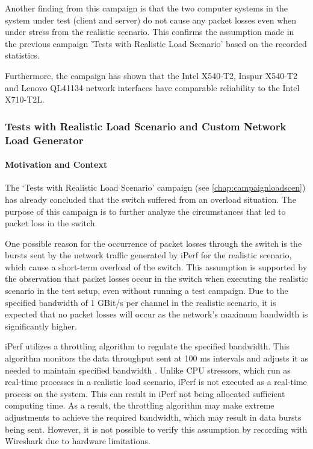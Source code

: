 Another finding from this campaign is that the two computer systems in the system under test (client and server) do not cause any packet losses even when under stress from the realistic scenario. This confirms the assumption made in the previous campaign 'Tests with Realistic Load Scenario' based on the recorded statistics.

Furthermore, the campaign has shown that the Intel X540-T2, Inspur X540-T2 and Lenovo QL41134 network interfaces have comparable reliability to the Intel X710-T2L.

\subsubsection{Tests with Realistic Load Scenario and Custom Network Load Generator}
\paragraph{Motivation and Context}
The `Tests with Realistic Load Scenario' campaign (see \ref{chap:campaignloadscen}) has already concluded that the switch suffered from an overload situation. The purpose of this campaign is to further analyze the circumstances that led to packet loss in the switch.

One possible reason for the occurrence of packet losses through the switch is the bursts sent by the network traffic generated by iPerf for the realistic scenario, which cause a short-term overload of the switch. This assumption is supported by the observation that packet losses occur in the switch when executing the realistic scenario in the test setup, even without running a test campaign. Due to the specified bandwidth of 1 GBit/s per channel in the realistic scenario, it is expected that no packet losses will occur as the network's maximum bandwidth is significantly higher.

iPerf utilizes a throttling algorithm to regulate the specified bandwidth. This algorithm monitors the data throughput sent at 100 ms intervals and adjusts it as needed to maintain specified bandwidth \cite{reli03}. Unlike CPU stressors, which run as real-time processes in a realistic load scenario, iPerf is not executed as a real-time process on the system. This can result in iPerf not being allocated sufficient computing time. As a result, the throttling algorithm may make extreme adjustments to achieve the required bandwidth, which may result in data bursts being sent. However, it is not possible to verify this assumption by recording with Wireshark due to hardware limitations.

